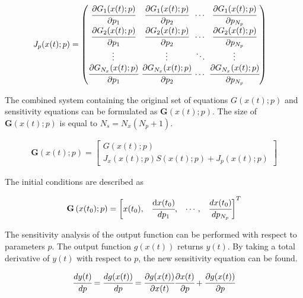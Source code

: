 \documentclass[../Article_Sensitivity_Analsysis.tex]{subfiles}
\begin{document}
	{\footnotesize
		\begin{align}
			{J_p}(x(t);p) & =
			\begingroup %
			\setlength\arraycolsep{2pt}
			\begin{pmatrix}
				\cfrac{\partial {G_{1}}(x(t);p)}{\partial {p_{1}}} & \cfrac{\partial {G_{1}}(x(t);p)}{\partial {p_{2}}} & \cdots & \cfrac{\partial {G_{1}}(x(t);p)}{\partial {p_{N_p}}}\\
				\cfrac{\partial {G_{2}}(x(t);p)}{\partial {p_{1}}} & \cfrac{\partial {G_{2}}(x(t);p)}{\partial {p_{2}}} & \cdots & \cfrac{\partial {G_{2}}(x(t);p)}{\partial {p_{N_p}}}\\
				\vdots & \vdots & \ddots & \vdots\\
				\cfrac{\partial {G_{N_x}}(x(t);p)}{\partial {p_{1}}} & \cfrac{\partial {G_{N_x}}(x(t);p)}{\partial {p_{2}}} & \cdots & \cfrac{\partial {G_{N_x}}(x(t);p)}{\partial {p_{N_p}}}
			\end{pmatrix}
			\endgroup
	\end{align}}
	
	The combined system containing the original set of equations ${G}(x(t);p)$ and sensitivity equations can be formulated as ${\textbf{G}}\left(x(t);p\right)$. The size of ${\textbf{G}}\left(x(t);p\right)$ is equal to $N_s = N_x(N_p + 1)$.
	
	{\footnotesize
		\begin{align}
			{\textbf{G}}\left(x(t);p\right) = 
			\begin{bmatrix}
				{G}(x(t);p)\\
				{J_x}(x(t);p)S(x(t);p) + {J_p}(x(t);p)
			\end{bmatrix}
	\end{align} }
	
	The initial conditions are described as
	
	{\footnotesize
		\begin{align}
			{\textbf{G}}\left(x(t_0);p\right)  = 
			\begin{bmatrix}x(t_0),						& 
				\cfrac{ \text{d}x(t_0) }{ d{p_1} },		& 
				\cdots,					 				&
				\cfrac{ dx(t_0) }{ d{p_{N_p}} } 
			\end{bmatrix}^T
	\end{align} }
	
	The sensitivity analysis of the output function can be performed with respect to parameters $p$. The output function $g(x(t))$ returns ${y}(t)$. By taking a total derivative of ${y}(t)$ with respect to $p$, the new sensitivity equation can be found.
	
	{\footnotesize
		\begin{equation}
			\cfrac{d {y}(t)}{dp} = \cfrac{d g(x(t))}{dp} = \cfrac{\partial g(x(t))}{\partial x(t)} \cfrac{\partial x(t)}{\partial p} + \cfrac{\partial g(x(t))}{\partial p}
	   \end{equation} }
	
\end{document}
